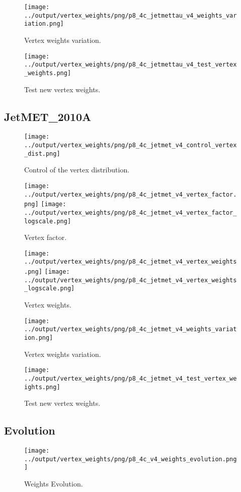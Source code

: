 \documentclass[11pt]{book}
\begin{document}
\begin{figure}[ht]
\centering
\texttt{[image: ../output/vertex\_weights/png/p8\_4c\_jetmettau\_v4\_weights\_variation.png]}
\caption{Vertex weights variation.}
\end{figure}

\begin{figure}[ht]
\centering
\texttt{[image: ../output/vertex\_weights/png/p8\_4c\_jetmettau\_v4\_test\_vertex\_weights.png]}
\caption{Test new vertex weights.}
\end{figure}
\clearpage

\subsection{JetMET\_2010A}
\begin{figure}[ht]
\centering
\texttt{[image: ../output/vertex\_weights/png/p8\_4c\_jetmet\_v4\_control\_vertex\_dist.png]}
\caption{Control of the vertex distribution.}
\end{figure}

\begin{figure}[ht]
\centering
\texttt{[image: ../output/vertex\_weights/png/p8\_4c\_jetmet\_v4\_vertex\_factor.png]}
\texttt{[image: ../output/vertex\_weights/png/p8\_4c\_jetmet\_v4\_vertex\_factor\_logscale.png]}
\caption{Vertex factor.}
\end{figure}

\begin{figure}[ht]
\centering
\texttt{[image: ../output/vertex\_weights/png/p8\_4c\_jetmet\_v4\_vertex\_weights.png]}
\texttt{[image: ../output/vertex\_weights/png/p8\_4c\_jetmet\_v4\_vertex\_weights\_logscale.png]}
\caption{Vertex weights.}
\end{figure}

\begin{figure}[ht]
\centering
\texttt{[image: ../output/vertex\_weights/png/p8\_4c\_jetmet\_v4\_weights\_variation.png]}
\caption{Vertex weights variation.}
\end{figure}

\begin{figure}[ht]
\centering
\texttt{[image: ../output/vertex\_weights/png/p8\_4c\_jetmet\_v4\_test\_vertex\_weights.png]}
\caption{Test new vertex weights.}
\end{figure}
\clearpage

\subsection{Evolution}
\begin{figure}[ht]
\centering
\texttt{[image: ../output/vertex\_weights/png/p8\_4c\_v4\_weights\_evolution.png]}
\caption{Weights Evolution.}
\end{figure}
\end{document}
